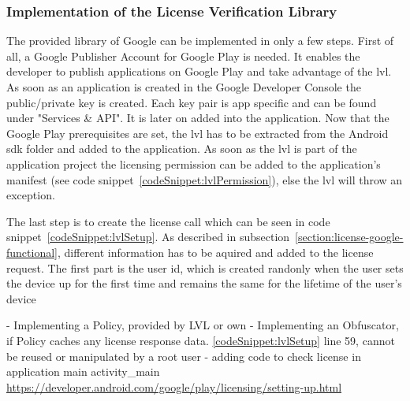 \subsubsection{Implementation of the License Verification Library} \label{section:license-google-implementation}
The provided library of Google can be implemented in only a few steps.
First of all, a Google Publisher Account for Google Play is needed.
It enables the developer to publish applications on Google Play and take advantage of the \gls{lvl}.
As soon as an application is created in the Google Developer Console the public/private key is created.
Each key pair is app specific and can be found under "Services \& API".
It is later on added into the application. \cite{developersLicensingSetup}
\newline
Now that the Google Play prerequisites are set, the \gls{lvl} has to be extracted from the Android \gls{sdk} folder and added to the application.
As soon as the \gls{lvl} is part of the application project the licensing permission can be added to the application's manifest (see code snippet~\ref{codeSnippet:lvlPermission}), else the \gls{lvl} will throw an exception.

The last step is to create the license call which can be seen in code snippet~\ref{codeSnippet:lvlSetup}.
As described in subsection~\ref{section:license-google-functional}, different information has to be aquired and added to the license request.
The first part is the user id, which is created randonly when the user sets the device up for the first time and remains the same for the lifetime of the user's device


- Implementing a Policy, provided by LVL or own
- Implementing an Obfuscator, if Policy caches any license response data. \ref{codeSnippet:lvlSetup} line 59, cannot be reused or manipulated by a root user
- adding code to check license in application main activity\_main
\cite{developersLicensingAdding}
%
\url{https://developer.android.com/google/play/licensing/setting-up.html}




\cite{developersLicensingSetup} \cite{developersLicensingAdding}
